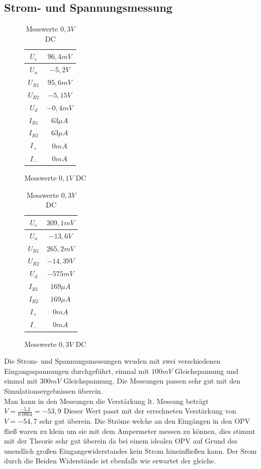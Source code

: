 \subsection{Strom- und Spannungsmessung}
\begin{table}[H]
\begin{minipage}{.5\textwidth}
\begin{figure}[H]
\centering
 \begin{tabular}{c|c}
  $U_e$ & $96,4mV$ \\ \hline
  $U_a$ & $-5,2V$ \\ \hline
  $U_{R1}$ & $95,6mV$ \\ \hline
  $U_{R2}$ & $-5,15V$ \\ \hline
  $U_d$ & $-0,4mV$ \\ \hline
  $I_{R1}$ & $63\mu A$ \\ \hline
  $I_{R2}$ & $63\mu A$ \\ \hline
  $I_+$ & $0mA$ \\ \hline
  $I_-$ & $0mA$ \\
 \end{tabular}
  \caption{Messwerte $0,1V$ DC}
\end{figure}
\end{minipage}
\begin{minipage}{.5\textwidth}
\begin{figure}[H]
  \centering
 \begin{tabular}{c|c}
  $U_e$ & $309,1mV$ \\ \hline
  $U_a$ & $-13,6V$ \\ \hline
  $U_{R1}$ & $265,2mV$ \\ \hline
  $U_{R2}$ & $-14,39V$ \\ \hline
  $U_d$ & $-575mV$ \\ \hline
  $I_{R1}$ & $169\mu A$ \\ \hline
  $I_{R2}$ & $169\mu A$ \\ \hline
  $I_+$ & $0mA$ \\ \hline
  $I_-$ & $0mA$ \\
 \end{tabular}
 \caption{Messwerte $0,3V$ DC}
\end{figure}
\end{minipage}
\end{table}
\noindent
Die Strom- und Spannungsmessungen wruden mit zwei verschiedenen Eingangsspannungen durchgef\"uhrt, einmal mit $100mV$ Gleichspannung und einmal mit $300mV$ Gleichspannung. Die Messungen passen sehr gut mit den Simulationsergebnissen \"uberein. \\
Man kann in den Messungen die Verst\"arkung lt. Messung betr\"agt $V=\frac{-5.2}{0.0964}=-53,9$ Dieser Wert passt mit der errechneten Verst\"arkung von $V=-54,7$ sehr gut \"uberein. Die Str\"ome welche an den Eing\"angen in den OPV flie\ss{} waren zu klein um sie mit dem Ampermeter messen zu k\"onnen, dies stimmt mit der Theorie sehr gut \"uberein da bei einem idealen OPV auf Grund des unendlich großen Eingangswiderstandes kein Strom hineinflie\ss{}en kann. Der Srom durch die Beiden Widerst\"ande ist ebenfalls wie erwartet der gleiche.


